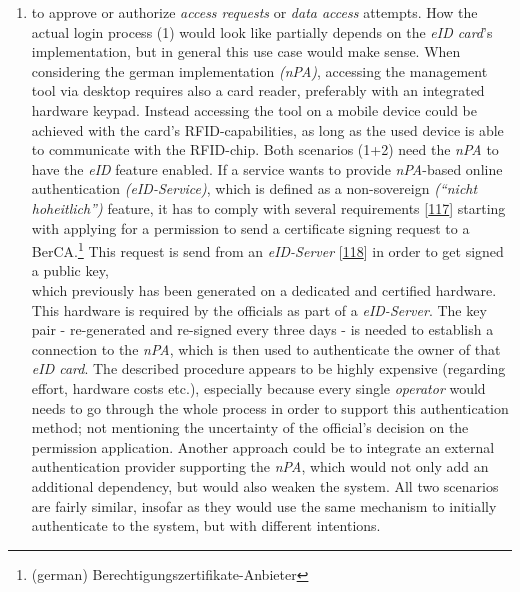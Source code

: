\documentclass[12pt,english,a4paper,titlepage,cleardoublepage=empty,dottedtoc]{report}
\providecommand{\tightlist}{%
  \setlength{\itemsep}{0pt}\setlength{\parskip}{0pt}}
\begin{document}
\begin{enumerate}
\def\labelenumi{(\arabic{enumi})}
\setcounter{enumi}{1}
\tightlist
\item
  to approve or authorize \emph{access requests} or \emph{data access}
  attempts. How the actual login process (1) would look like partially
  depends on the \emph{eID card}'s implementation, but in general this
  use case would make sense. When considering the german implementation
  \emph{(nPA)}, accessing the management tool via desktop requires also
  a card reader, preferably with an integrated hardware keypad. Instead
  accessing the tool on a mobile device could be achieved with the
  card's RFID-capabilities, as long as the used device is able to
  communicate with the RFID-chip. Both scenarios (1+2) need the
  \emph{nPA} to have the \emph{eID} feature enabled. If a service wants
  to provide \emph{nPA}-based online authentication
  \emph{(eID-Service)}, which is defined as a non-sovereign
  \emph{(``nicht hoheitlich'')} feature, it has to comply with several
  requirements {[}\protect\hyperlink{ref-web_bsi-spec_eid}{117}{]}
  starting with applying for a permission to send a certificate signing
  request to a BerCA.\footnote{(german)
    Berechtigungszertifikate-Anbieter} This request is send from an
  \emph{eID-Server}
  {[}\protect\hyperlink{ref-web_2017_npa-eid-server}{118}{]} in order to
  get signed a public key,\\
  which previously has been generated on a dedicated and certified
  hardware. This hardware is required by the officials as part of a
  \emph{eID-Server}. The key pair - re-generated and re-signed every
  three days - is needed to establish a connection to the \emph{nPA},
  which is then used to authenticate the owner of that \emph{eID card}.
  The described procedure appears to be highly expensive (regarding
  effort, hardware costs etc.), especially because every single
  \emph{operator} would needs to go through the whole process in order
  to support this authentication method; not mentioning the uncertainty
  of the official's decision on the permission application. Another
  approach could be to integrate an external authentication provider
  supporting the \emph{nPA}, which would not only add an additional
  dependency, but would also weaken the system. All two scenarios are
  fairly similar, insofar as they would use the same mechanism to
  initially authenticate to the system, but with different intentions.
\end{enumerate}
\end{document}
